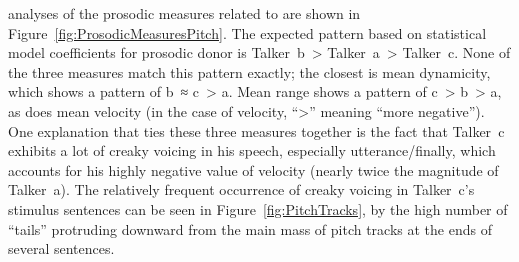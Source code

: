 \Ph{} analyses of the prosodic measures related to \fo{} are shown in Figure~\ref{fig:ProsodicMeasuresPitch}.  The expected pattern based on statistical model coefficients for prosodic donor is Talker~\ac{b}~> Talker~\ac{a}~> Talker~\ac{c}.  None of the three measures match this pattern exactly; the closest is mean \fo{} dynamicity, which shows a pattern of \ac{b}~≈ \ac{c}~> \ac{a}.  Mean \fo{} range shows a pattern of \ac{c}~> \ac{b}~> \ac{a}, as does mean \fo{} velocity (in the case of velocity, “>” meaning “more negative”).\footnotemark{}  One explanation that ties these three measures together is the fact that Talker~\ac{c} exhibits a lot of creaky voicing in his speech, especially utterance\-/finally, which accounts for his highly negative value of \fo{} velocity (nearly twice the magnitude of Talker~\ac{a}).  The relatively frequent occurrence of creaky voicing in Talker~\ac{c}’s stimulus sentences can be seen in Figure~\ref{fig:PitchTracks}, by the high number of “tails” protruding downward from the main mass of pitch tracks at the ends of several sentences.


